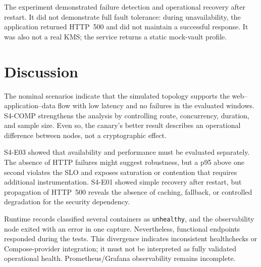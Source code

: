 \documentclass[12pt]{article}
\begin{document}
The experiment demonstrated failure detection and operational recovery after restart. It did not demonstrate full fault tolerance: during unavailability, the application returned HTTP~500 and did not maintain a successful response. It was also not a real KMS; the service returns a static mock-vault profile.

\section{Discussion}
The nominal scenarios indicate that the simulated topology supports the web--application--data flow with low latency and no failures in the evaluated windows. S4-COMP strengthens the analysis by controlling route, concurrency, duration, and sample size. Even so, the canary's better result describes an operational difference between nodes, not a cryptographic effect.

S4-E03 showed that availability and performance must be evaluated separately. The absence of HTTP failures might suggest robustness, but a p95 above one second violates the SLO and exposes saturation or contention that requires additional instrumentation. S4-E01 showed simple recovery after restart, but propagation of HTTP~500 reveals the absence of caching, fallback, or controlled degradation for the security dependency.

Runtime records classified several containers as \texttt{unhealthy}, and the observability node exited with an error in one capture. Nevertheless, functional endpoints responded during the tests. This divergence indicates inconsistent healthchecks or Compose-provider integration; it must not be interpreted as fully validated operational health. Prometheus/Grafana observability remains incomplete.
\end{document}
